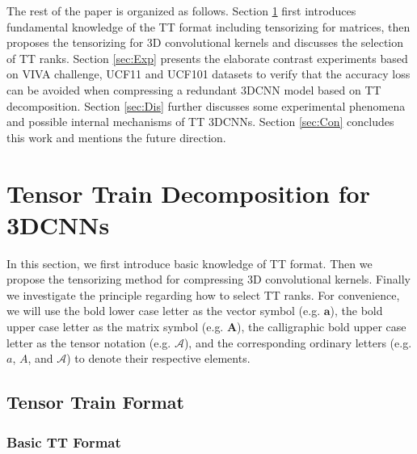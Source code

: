 \documentclass[a4paper,fleqn]{cas-dc}
\begin{document}
The rest of the paper is organized as follows. Section \ref{sec:Method} first introduces fundamental knowledge of the TT format including tensorizing for matrices, then proposes the tensorizing for 3D convolutional kernels and discusses the selection of TT ranks. Section \ref{sec:Exp} presents the elaborate contrast experiments based on VIVA challenge, UCF11 and UCF101 datasets to verify that the accuracy loss can be avoided when compressing a redundant 3DCNN model based on TT decomposition. Section \ref{sec:Dis} further discusses some experimental phenomena and possible internal mechanisms of TT 3DCNNs. Section \ref{sec:Con} concludes this work and mentions the future direction.




\section{Tensor Train Decomposition for 3DCNNs}\label{sec:Method}

In this section, we first introduce basic knowledge of TT format. Then we propose the tensorizing method for compressing 3D convolutional kernels. Finally we investigate the principle  regarding  how to select TT ranks. For convenience, we will use the bold lower case letter as the vector symbol (e.g. \( \bm{a} \)), the bold upper case letter as the matrix symbol (e.g. \( \bm{A} \)), the calligraphic bold upper case letter as the tensor notation (e.g. \( \bm{ \mathcal{A} } \)), and the corresponding ordinary letters (e.g. \(a\), \(A\), and \(\mathcal{A}\)) to denote their respective elements.

\subsection{Tensor Train Format}

\subsubsection{Basic TT Format}\quad
\end{document}
